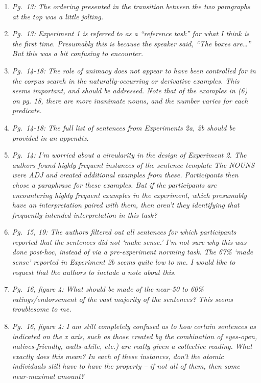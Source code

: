 \documentclass[12pt]{article}
\begin{document}
\begin{enumerate}
\item \emph{Pg.~13: The ordering presented in the transition between the two paragraphs at the top was a little jolting.} 
	
\item \emph{Pg.~13: Experiment 1 is referred to as a ``reference task'' for what I think is the first time. Presumably this is because the speaker said, ``The boxes are\ldots'' But this was a bit confusing to encounter.}

\item \emph{Pg.~14-18: The role of animacy does not appear to have been controlled for in the corpus search in the naturally-occurring or derivative examples. This seems important, and should be addressed. Note that of the examples in (6) on pg. 18, there are more inanimate nouns, and the number varies for each predicate.}

\item \emph{Pg.~14-18: The full list of sentences from Experiments 2a, 2b should be provided in an appendix.}

\item \emph{Pg.~14: I'm worried about a circularity in the design of Experiment 2. The authors found highly frequent instances of the sentence template \emph{The NOUNS were ADJ} and created additional examples from these. Participants then chose a paraphrase for these examples. But if the participants are encountering highly frequent examples in the experiment, which presumably have an interpretation paired with them, then aren't they identifying that frequently-intended interpretation in this task?}

\item \emph{Pg.~15, 19: The authors filtered out all sentences for which participants reported that the sentences did not `make sense.' I'm not sure why this was done post-hoc, instead of via a pre-experiment norming task. The 67\% `made sense' reported in Experiment 2b seems quite low to me. I would like to request that the authors to include a note about this.}

\item \emph{Pg.~16, figure 4: What should be made of the near-50 to 60\% ratings/endorsement of the vast majority of the sentences? This seems troublesome to me.}

\item \emph{Pg.~16, figure 4: I am still completely confused as to how certain sentences as indicated on the x axis, such as those created by the combination of eyes-open, natives-friendly, walls-white, etc.) are really given a collective reading. What exactly does this mean? In each of these instances, don’t the atomic individuals still have to have the property – if not all of them, then some near-maximal amount?}


\end{enumerate}
\end{document}

